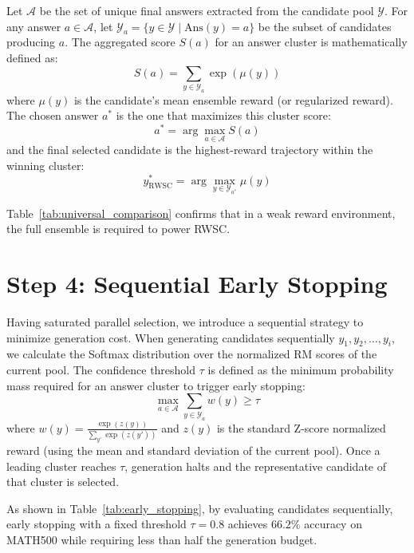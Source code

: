 \documentclass[a4paper,11pt]{article}
\begin{document}
Let $\mathcal{A}$ be the set of unique final answers extracted from the candidate pool $\mathcal{Y}$. For any answer $a \in \mathcal{A}$, let $\mathcal{Y}_a = \{ y \in \mathcal{Y} \mid \text{Ans}(y) = a \}$ be the subset of candidates producing $a$. The aggregated score $S(a)$ for an answer cluster is mathematically defined as:
\begin{equation}
\label{eq:rwsc_score}
S(a) = \sum_{y \in \mathcal{Y}_a} \exp\left( \mu(y) \right)
\end{equation}
where $\mu(y)$ is the candidate's mean ensemble reward (or regularized reward). The chosen answer $a^*$ is the one that maximizes this cluster score:
\begin{equation}
\label{eq:rwsc_ans}
a^* = \arg\max_{a \in \mathcal{A}} S(a)
\end{equation}
and the final selected candidate is the highest-reward trajectory within the winning cluster:
\begin{equation}
\label{eq:rwsc_cand}
y^*_{\text{RWSC}} = \arg\max_{y \in \mathcal{Y}_{a^*}} \mu(y)
\end{equation}

Table~\ref{tab:universal_comparison} confirms that in a weak reward environment, the full ensemble is required to power RWSC.

\section{Step 4: Sequential Early Stopping}
\label{sec:early_stopping}
Having saturated parallel selection, we introduce a sequential strategy to minimize generation cost. When generating candidates sequentially $y_1, y_2, \dots, y_i$, we calculate the Softmax distribution over the normalized RM scores of the current pool. The confidence threshold $\tau$ is defined as the minimum probability mass required for an answer cluster to trigger early stopping:
\begin{equation}
\label{eq:tau_def}
\max_{a \in \mathcal{A}} \sum_{y \in \mathcal{Y}_a} w(y) \geq \tau
\end{equation}
where $w(y) = \frac{\exp(z(y))}{\sum_{y'} \exp(z(y'))}$ and $z(y)$ is the standard Z-score normalized reward (using the mean and standard deviation of the current pool). Once a leading cluster reaches $\tau$, generation halts and the representative candidate of that cluster is selected.

As shown in Table~\ref{tab:early_stopping}, by evaluating candidates sequentially, early stopping with a fixed threshold $\tau=0.8$ achieves $66.2\%$ accuracy on MATH500 while requiring less than half the generation budget.
\end{document}
